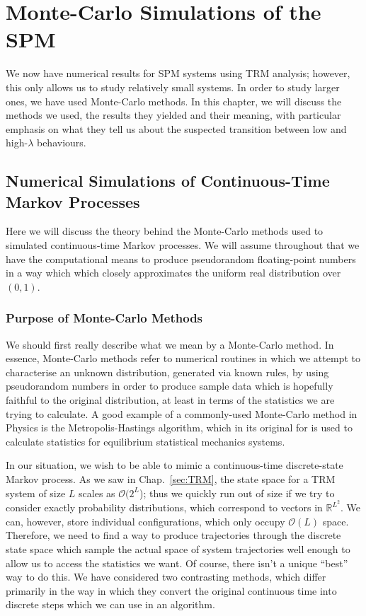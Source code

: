 \chapter{Monte-Carlo Simulations of the SPM} 
\label{sec:numerics}
We now have numerical results for SPM systems using TRM analysis; however, this only allows us to study
relatively small systems. In order to study larger ones, we have used Monte-Carlo methods. In this
chapter, we will discuss the methods we used, the results they yielded and their meaning, with 
particular emphasis on what they tell us about the suspected transition between low and high-$\lambda$
behaviours.
\section{Numerical Simulations of Continuous-Time Markov Processes}
Here we will discuss the theory behind the Monte-Carlo methods used to simulated continuous-time Markov
processes. We will assume throughout that we have the computational means to produce pseudorandom
floating-point numbers in a way which which closely approximates the uniform real distribution over $(0, 1)$.
\subsection{Purpose of Monte-Carlo Methods}
We should first really describe what we mean by a Monte-Carlo method. In essence, Monte-Carlo methods
refer to numerical routines in which we attempt to characterise an unknown distribution, generated 
via known rules, by using
pseudorandom numbers in order to produce sample data which is hopefully faithful to the original 
distribution, at least in terms of the statistics we are trying to calculate. A good example of a
commonly-used Monte-Carlo method in Physics is the Metropolis-Hastings algorithm, which in its original
for is used to calculate statistics for equilibrium statistical mechanics systems.

In our situation, we wish to be able to mimic a continuous-time discrete-state Markov process.
As we saw in Chap.~\ref{sec:TRM}, the state space for a TRM system of size $L$ scales as
$\mathcal{O}(2^L$); thus we quickly run out of size if we try to consider exactly probability distributions, which correspond to
vectors in $\mathbb{R}^{L^2}$. We can, however, store individual configurations, which only occupy
$\mathcal{O}(L)$ space. Therefore, we need to find a way to produce trajectories through the discrete
state space which sample the actual space of system trajectories well enough to allow us to access the
statistics we want. Of course, there isn't a unique ``best'' way to do this. We have considered two
contrasting methods, which differ primarily in the way in which they convert the original continuous 
time into discrete steps which we can use in an algorithm.

